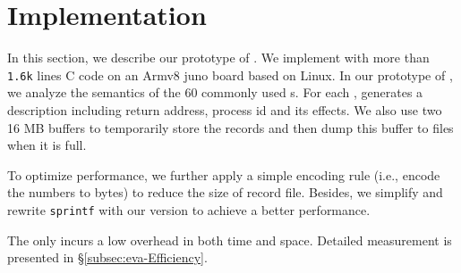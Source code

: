 \section{Implementation}

In this section, we describe our prototype of \TheName. We implement \TheName
with more than \texttt{1.6k} lines C code
on an Armv8 juno board based on Linux. In our prototype of \TheName, we analyze the semantics of the 60 commonly used
\syscall{}s. For each \syscall{}, \TheName generates a description including  return address, process id and its effects. We also use two 16 MB buffers to temporarily store
the \syscall{} records and then dump this buffer to files when it is full. 

To optimize performance, we further apply a simple encoding rule (i.e., encode the numbers to bytes) to reduce the size of record file. Besides, we simplify and rewrite \texttt{sprintf} with our version to achieve a better performance.

The \TheName only incurs a low overhead in both time and space. Detailed measurement is presented
in \S \ref{subsec:eva-Efficiency}.








